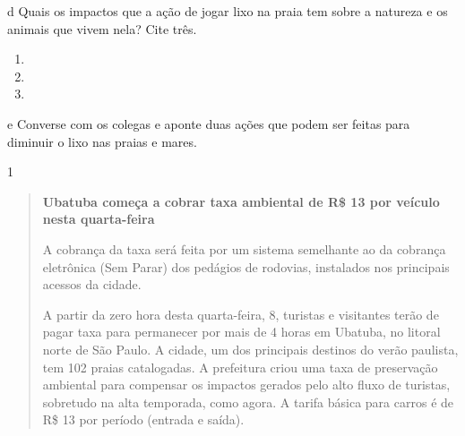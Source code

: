 
\num{d} Quais os impactos que a ação de jogar lixo na praia tem sobre a natureza
e os animais que vivem nela? Cite três.

\begin{enumerate}
\item {}

\item {}

\item {}
\end{enumerate}


\num{e} Converse com os colegas e aponte duas ações que podem ser feitas para
diminuir o lixo nas praias e mares.



\num{1}

\begin{quote}
\textbf{Ubatuba começa a cobrar taxa ambiental de R\$ 13 por veículo
nesta quarta-feira}

A cobrança da taxa será feita por um sistema semelhante ao da cobrança
eletrônica (Sem Parar) dos pedágios de rodovias, instalados nos
principais acessos da cidade.

A partir da zero hora desta quarta-feira, 8, turistas e visitantes terão
de pagar taxa para permanecer por mais de 4 horas em Ubatuba, no litoral
norte de São Paulo. A cidade, um dos principais destinos do verão
paulista, tem 102 praias catalogadas. A prefeitura criou uma taxa de
preservação ambiental para compensar os impactos gerados pelo alto fluxo
de turistas, sobretudo na alta temporada, como agora. A tarifa básica
para carros é de R\$ 13 por período (entrada e saída).

\end{quote}

